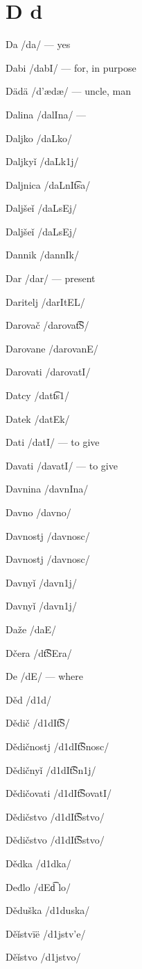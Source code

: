 \chapter{D d}

Da /da/ — yes

Dabi /dabI/ — for, in purpose

Dädä /d’ædæ/ — uncle, man

Dalina /dalIna/ —

Daljko /daLko/

Daljkyǐ /daLk1j/

Daljnica /daLnI\t{ts}a/

Daljšeǐ /daL\:sEj/

Daljšeǐ /daL\:sEj/

Dannik /dannIk/

Dar /dar/ — present

Daritelj /darItEL/

Darovač /darova\t{tS}/

Darovane /darovanE/

Darovati /darovatI/

Datcy /dat\t{ts}1/

Datek /datEk/

Dati /datI/ — to give

Davati /davatI/ — to give

Davnina /davnIna/

Davno /davno/

Davnostj /davnosc/

Davnostj /davnosc/

Davnyǐ /davn1j/

Davnyǐ /davn1j/

Daže /da\textctz  E/

Dčera /d\t{tS}Era/

De /dE/ — where

Děd /d1d/

Dědič /d1dI\t{tS}/

Dědičnostj /d1dI\t{tS}nosc/

Dědičnyǐ /d1dI\t{tS}n1j/

Dědičovati /d1dI\t{tS}ovatI/

Dědičstvo /d1dI\t{tS}stvo/

Dědičstvo /d1dI\t{tS}stvo/

Dědka /d1dka/

Deđlo /dE\t{d \textctz}lo/

Děduška /d1du\:ska/

Děǐstvïë /d1jstv’e/

Děǐstvo /d1jstvo/

